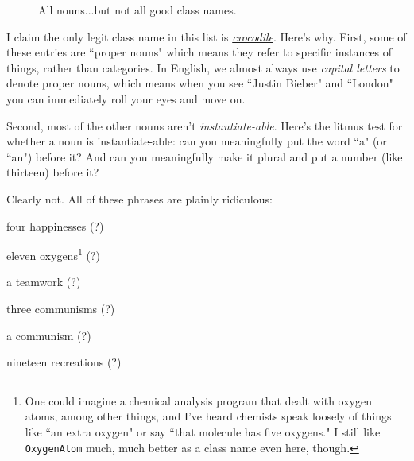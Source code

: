 \setlength{\fboxsep}{1pt}
\begin{figure}[hb]
\centering
{}
\vspace{.1in}
\caption{All nouns...but not all good class names.}
\label{fig:nouns}
\end{figure}

I claim the only legit class name in this list is
\underline{\textit{crocodile}}. Here's why. First, some of these entries are
``proper nouns" which means they refer to specific instances of things, rather
than categories. In English, we almost always use \textit{capital letters} to
denote proper nouns, which means when you see ``Justin Bieber" and ``London"
you can immediately roll your eyes and move on.

Second, most of the other nouns aren't \textit{instantiate-able}. Here's the
litmus test for whether a noun is instantiate-able: can you meaningfully
put the word ``a" (or ``an") before it? And can you meaningfully make it
plural and put a number (like thirteen) before it?

Clearly not. All of these phrases are plainly ridiculous:

\begin{multicols}{2}
\begin{compactitem}
\item four happinesses (?)
\item eleven oxygens\footnote{One could imagine a chemical analysis program
that dealt with oxygen atoms, among other things, and I've heard chemists
speak loosely of things like ``an extra oxygen" or say ``that molecule has
five oxygens." I still like \texttt{OxygenAtom} much, much better as a class
name even here, though.} (?)
\item a teamwork (?)
\columnbreak
\item three communisms (?)
\item a communism (?)
\item nineteen recreations (?)
\end{compactitem}
\end{multicols}

